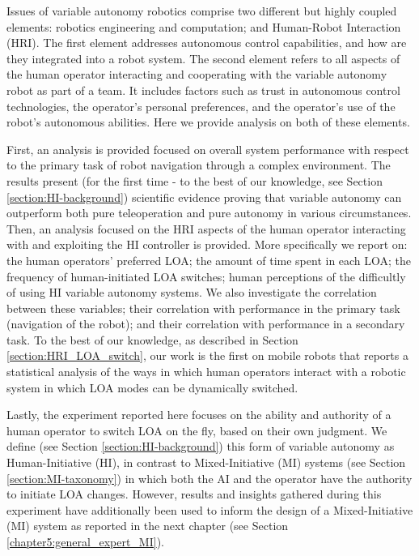 \documentclass[a4paper,12pt,oneside,openright]{bhamthesis}
\begin{document}
Issues of variable autonomy robotics comprise two different but highly coupled elements: robotics engineering and computation; and Human-Robot Interaction (HRI). The first element addresses autonomous control capabilities, and how are they integrated into a robot system. The second element refers to all aspects of the human operator interacting and cooperating with the variable autonomy robot as part of a team. It includes factors such as trust in autonomous control technologies, the operator's personal preferences, and the operator's use of the robot's autonomous abilities. Here we provide analysis on both of these elements.

First, an analysis is provided focused on overall system performance with respect to the primary task of robot navigation through a complex environment. The results present (for the first time - to the best of our knowledge, see Section \ref{section:HI-background}) scientific evidence proving that variable autonomy can outperform both pure teleoperation and pure autonomy in various circumstances. Then, an analysis focused on the HRI aspects of the human operator interacting with and exploiting the HI controller is provided. More specifically we report on: the human operators' preferred LOA; the amount of time spent in each LOA; the frequency of human-initiated LOA switches; human perceptions of the difficultly of using HI variable autonomy systems. We also investigate the correlation between these variables; their correlation with performance in the primary task (navigation of the robot); and their correlation with performance in a secondary task. To the best of our knowledge, as described in Section \ref{section:HRI_LOA_switch}, our work is the first on mobile robots that reports a statistical analysis of the ways in which human operators interact with a robotic system in which LOA modes can be dynamically switched.

Lastly, the experiment reported here focuses on the ability and authority of a human operator to switch LOA on the fly, based on their own judgment. We define (see Section \ref{section:HI-background}) this form of variable autonomy as Human-Initiative (HI), in contrast to Mixed-Initiative (MI) systems (see Section \ref{section:MI-taxonomy}) in which both the AI and the operator have the authority to initiate LOA changes. However, results and insights gathered during this experiment have additionally been used to inform the design of a Mixed-Initiative (MI) system as reported in the next chapter (see Section \ref{chapter5:general_expert_MI}).
\end{document}

